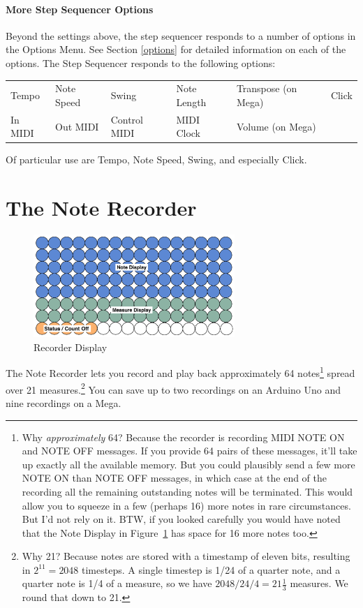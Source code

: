 \documentclass{article}
\begin{document}
\paragraph{More Step Sequencer Options}

Beyond the settings above, the step sequencer responds to a number of options in the Options Menu.  See Section \ref{options} for detailed information on each of the options.  The Step Sequencer responds to the following options:


\vspace{1em}
\begin{tabular}{llllll}
Tempo& Note Speed& Swing & Note Length&Transpose (on Mega)&Click\\
In MIDI& Out MIDI&Control MIDI&MIDI Clock&Volume (on Mega)\\
\end{tabular}

\vspace{1em}
Of particular use are Tempo, Note Speed, Swing, and especially Click.


\clearpage

\section {The Note Recorder}

\begin{figure}
\vspace{-1.5em}\includegraphics[width=3in]{recorder.pdf}
\vspace{-2em}\caption{\small Recorder Display}\vspace{-1em}
\label{recorder}
\end{figure}

The Note Recorder lets you record and play back approximately 64 notes\footnote{Why {\it approximately} 64? Because the recorder is recording MIDI NOTE ON and NOTE OFF messages.  If you provide 64 pairs of these messages, it'll take up exactly all the available memory.  But you could plausibly send a few more NOTE ON than NOTE OFF messages, in which case at the end of the recording all the remaining outstanding notes will be terminated.  This would allow you to squeeze in a few (perhaps 16) more notes in rare circumstances.  But I'd not rely on it.  BTW, if you looked carefully you would have noted that the Note Display in Figure~\ref{recorder} has space for 16 more notes too.} spread over 21 measures.\footnote{Why 21?  Because notes are stored with a timestamp of eleven bits, resulting in \(2^{11} = 2048\) timesteps.  A single timestep is 1/24 of a quarter note, and a quarter note is 1/4 of a measure, so we have \(2048 / 24 / 4 = 21 \frac{1}{3}\) measures.  We round that down to 21.}  You can save up to two recordings on an Arduino Uno and nine recordings on a Mega.
\end{document}
